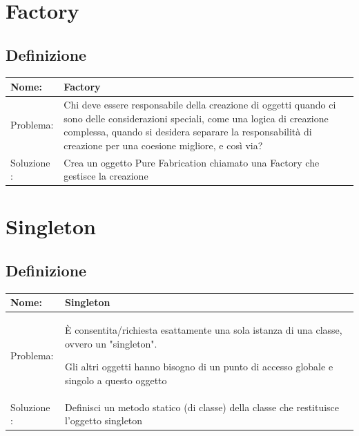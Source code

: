 \newpage
\section{Factory}
\subsection{Definizione}
\begin{table}[htbp]
    \renewcommand{\arraystretch}{1.8}
    \begin{tabularx}{\textwidth}{@{} p{2.8cm} X @{}}
        \hline
        Nome: & \textbf{Factory} \\
        \hline
        Problema: & 
        Chi deve essere responsabile della creazione di oggetti quando ci sono delle considerazioni speciali, come una logica di creazione complessa, quando si desidera separare la responsabilità di creazione per una coesione migliore, e così via?
        \\
        \hline
        Soluzione : &
        Crea un oggetto Pure Fabrication chiamato una Factory che gestisce la creazione
        \\
        \hline
    \end{tabularx}
\end{table}

\newpage
\section{Singleton}
\subsection{Definizione}
\begin{table}[htbp]
    \renewcommand{\arraystretch}{1.8}
    \begin{tabularx}{\textwidth}{@{} p{2.8cm} X @{}}
        \hline
        Nome: & \textbf{Singleton} \\
        \hline
        Problema: & 
        È consentita/richiesta esattamente una sola istanza di una classe, ovvero un "singleton".

        Gli altri oggetti hanno bisogno di un punto di accesso globale e singolo a questo oggetto
        \\
        \hline
        Soluzione : &
        Definisci un metodo statico (di classe) della classe che restituisce l'oggetto singleton
        \\
        \hline
    \end{tabularx}
\end{table}

